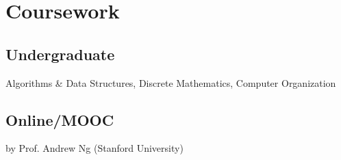 
\section{Coursework}
\subsection{Undergraduate}
Algorithms \& Data Structures,
Discrete Mathematics,
Computer Organization
\sectionsep

\subsection{Online/MOOC}
 by Prof. Andrew Ng (Stanford University)
\sectionsep

